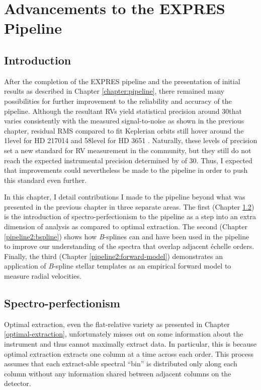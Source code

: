 \chapter{Advancements to the EXPRES Pipeline} \label{chapter:pipeline2}

\section{Introduction}

After the completion of the EXPRES pipeline and the presentation of initial results as described in Chapter \ref{chapter:pipeline}, there remained many possibilities for further improvement to the reliability and accuracy of the pipeline. Although the resultant RVs yield statistical precision around 30\cms that varies consistently with the measured signal-to-noise as shown in the previous chapter, residual RMS compared to fit Keplerian orbits still hover around the 1\ms level for HD 217014 \citep{petersburg_extreme-precision_2020} and 58\cms level for HD 3651 \citep{brewer_expres_2020}. Naturally, these levels of precision set a new standard for RV measurement in the community, but they still do not reach the expected instrumental precision determined by \citet{blackman_performance_2020} of 30\cms. Thus, I expected that improvements could nevertheless be made to the pipeline in order to push this standard even further.

In this chapter, I detail contributions I made to the pipeline beyond what was presented in the previous chapter in three separate areas. The first (Chapter \ref{pipeline2:spec-perf}) is the introduction of spectro-perfectionism to the pipeline as a step into an extra dimension of analysis as compared to optimal extraction. The second (Chapter \ref{pipeline2:bspline}) shows how \textit{B}-splines can and have been used in the pipeline to improve our understanding of the spectra that overlap adjacent \'{e}chelle orders. Finally, the third (Chapter \ref{pipeline2:forward-model}) demonstrates an application of \textit{B}-spline stellar templates as an empirical forward model to measure radial velocities.

\section{Spectro-perfectionism} \label{pipeline2:spec-perf}

Optimal extraction, even the flat-relative variety as presented in Chapter \ref{optimal-extraction}, unfortunately misses out on some information about the instrument and thus cannot maximally extract data. In particular, this is because optimal extraction extracts one column at a time across each order. This process assumes that each extract-able spectral ``bin'' is distributed only along each column without any information shared between adjacent columns on the detector.

